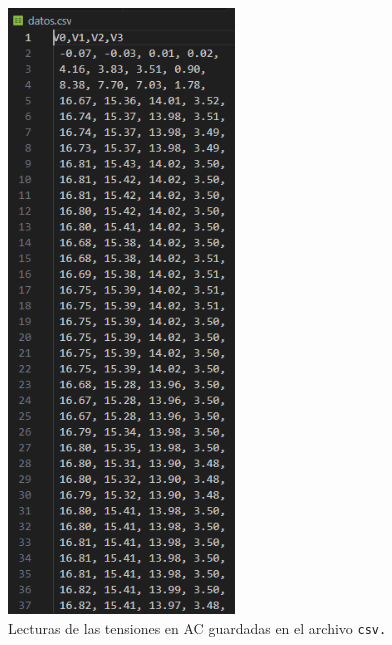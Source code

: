 \begin{figure}
    \centering
    \includegraphics[width=6cm]{Imagenes/AC-saved.png}
    \caption{Lecturas de las tensiones en AC guardadas en el archivo \tt{csv}.}
    \label{ac2}
\end{figure}


































